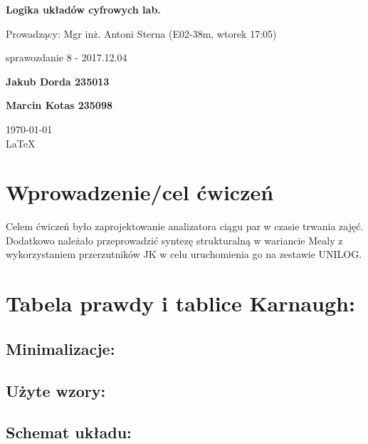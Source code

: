\documentclass[12pt,a4paper]{article}
\begin{document}
	
	\begin{titlepage}
		
		\centering
		{\huge\bfseries Logika układów cyfrowych lab.\par}
		
		\vspace{0.5cm}
		Prowadzący: Mgr inż. Antoni Sterna (E02-38m, wtorek 17:05) \\
	
		\vspace{1.1cm}
		{\Large sprawozdanie 8 - 2017.12.04\par}
		\vfill
		
		{\large\bfseries Jakub Dorda 235013\par}
		{\large\bfseries Marcin Kotas 235098\par}
		
		\vspace{1cm}
		\today \\ \LaTeX
		
		\restoregeometry
	\end{titlepage}


	\section{Wprowadzenie/cel ćwiczeń}
	
		Celem ćwiczeń było zaprojektowanie analizatora ciągu par w czasie trwania zajęć. Dodatkowo należało przeprowadzić syntezę strukturalną  w wariancie Mealy z wykorzystaniem przerzutników JK w celu uruchomienia go na zestawie UNILOG.
		
	\section{Tabela prawdy i tablice Karnaugh:}
		
		\subsection{Minimalizacje:}
	
		\subsection{Użyte wzory:}
		
		\subsection{Schemat układu:}
		
\end{document}
